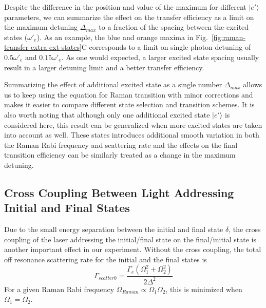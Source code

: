 Despite the difference in the position and value of the maximum for different
$|e'\rangle$ parameters, we can summarize the effect on the transfer efficiency
as a limit on the maximum detuning $\Delta_{max}$ to a fraction of the spacing
between the excited states ($\omega'_e$).
As an example, the blue and orange maxima in Fig.~\ref{fig:raman-transfer-extra-ext-states}C
corresponds to a limit on single photon detuning of $0.5\omega'_e$ and $0.15\omega'_e$.
As one would expected, a larger excited state spacing usually result in
a larger detuning limit and a better transfer efficiency.

Summarizing the effect of additional excited state as a single number $\Delta_{max}$ allows
us to keep using the equation for Raman transition with minor corrections
and makes it easier to compare different state selection and transition schemes.
It is also worth noting that although only one additional excited state $|e'\rangle$
is considered here, this result can be generalized when more excited states are taken into account
as well. These states introduces additional smooth variation in both the Raman Rabi frequency
and scattering rate and the effects on the final transition efficiency can be similarly
treated as a change in the maximum detuning.

\subsection{Cross Coupling Between Light Addressing Initial and Final States}

Due to the small energy separation between the initial and final state $\delta$,
the cross coupling of the laser addressing the initial/final state on the final/initial state
is another important effect in our experiment.
Without the cross coupling, the total off resonance scattering rate for
the initial and the final states is
\[
  \Gamma_{scatter0}=\frac{\Gamma_e\left(\Omega_1^2+\Omega_2^2\right)}{2\Delta^2}
\]
For a given Raman Rabi frequency $\Omega_{Raman}\propto\Omega_1\Omega_2$, this is
minimized when $\Omega_1=\Omega_2$.


